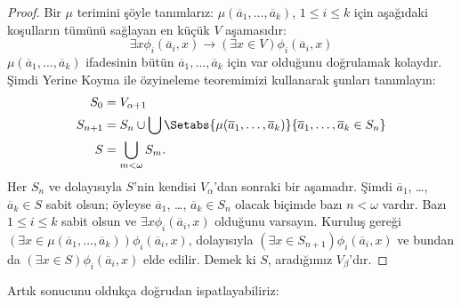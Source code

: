 \begin{proof}
Bir $\mu$ terimini şöyle tanımlarız: $\mu(\overline{a}_1, \ldots,
\overline{a}_k)$, $1 \leq i \leq k$ için aşağıdaki koşulların tümünü
sağlayan en küçük $V$ aşamasıdır:
\[
\exists x\phi_i(\overline{a}_i, x) \rightarrow (\exists x \in V) \phi_i(\overline{a}_i, x)
\]
$\mu(\overline{a}_1, \ldots, \overline{a}_k)$ ifadesinin bütün
$\overline{a}_1, \ldots, \overline{a}_k$ için var olduğunu doğrulamak
kolaydır. Şimdi Yerine Koyma ile özyineleme teoremimizi kullanarak şunları
tanımlayın:
\begin{align*}
	S_0 & = V_{\alpha+1}\\
	S_{n+1} & = S_n \cup \bigcup
	\Setabs{\mu(\overline{a}_1, \ldots, \overline{a}_k)}
	{\overline{a}_1, \ldots, \overline{a}_k \in S_n} \\
	S &= \bigcup_{m < \omega} S_m.
\end{align*}
Her $S_n$ ve dolayısıyla $S$'nin kendisi $V_\alpha$'dan sonraki bir aşamadır.
Şimdi $\overline{a}_1$, \dots,~$\overline{a}_k \in S$ sabit olsun; öyleyse
$\overline{a}_1$, \dots, $\overline{a}_k \in S_n$ olacak biçimde bazı
$n < \omega$ vardır. Bazı $1 \leq i \leq k$ sabit olsun ve
$\exists x \phi_i(\overline{a}_i,x)$ olduğunu varsayın. Kuruluş gereği
$(\exists x \in \mu(\overline{a}_1, \ldots,
\overline{a}_k))\phi_i(\overline{a}_i, x)$, dolayısıyla
$(\exists x \in S_{n+1})\phi_i(\overline{a}_i, x)$ ve bundan da
$(\exists x \in S)\phi_i(\overline{a}_i, x)$ elde edilir. Demek ki $S$,
aradığımız $V_\beta$'dır.
\end{proof}
\noindent 
Artık  sonucunu oldukça
doğrudan ispatlayabiliriz:

